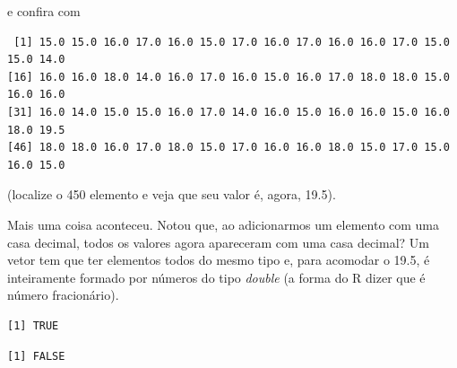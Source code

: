 \documentclass[
]{article}
\newenvironment{Shaded}{\begin{snugshade}}{\end{snugshade}}
\newcommand{\FunctionTok}[1]{\textcolor[rgb]{0.00,0.00,0.00}{#1}}
\newcommand{\NormalTok}[1]{#1}
\newcommand{\SpecialCharTok}[1]{\textcolor[rgb]{0.00,0.00,0.00}{#1}}
\begin{document}
e confira com

\begin{Shaded}
\end{Shaded}

\begin{verbatim}
 [1] 15.0 15.0 16.0 17.0 16.0 15.0 17.0 16.0 17.0 16.0 16.0 17.0 15.0 15.0 14.0
[16] 16.0 16.0 18.0 14.0 16.0 17.0 16.0 15.0 16.0 17.0 18.0 18.0 15.0 16.0 16.0
[31] 16.0 14.0 15.0 15.0 16.0 17.0 14.0 16.0 15.0 16.0 16.0 15.0 16.0 18.0 19.5
[46] 18.0 18.0 16.0 17.0 18.0 15.0 17.0 16.0 16.0 18.0 15.0 17.0 15.0 16.0 15.0
\end{verbatim}

(localize o 450 elemento e veja que seu valor é, agora, 19.5).

Mais uma coisa aconteceu. Notou que, ao adicionarmos um elemento com uma
casa decimal, todos os valores agora apareceram com uma casa decimal? Um
vetor tem que ter elementos todos do mesmo tipo e, para acomodar o 19.5,
é inteiramente formado por números do tipo \emph{double} (a forma do R
dizer que é número fracionário).

\begin{Shaded}
\end{Shaded}

\begin{verbatim}
[1] TRUE
\end{verbatim}

\begin{Shaded}
\end{Shaded}

\begin{verbatim}
[1] FALSE
\end{verbatim}

\begin{Shaded}
\end{Shaded}
\end{document}
